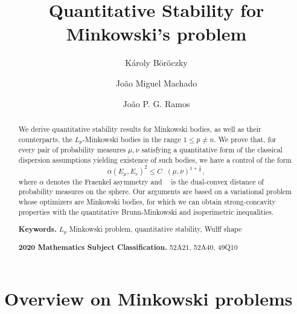 \documentclass[a4paper, 10pt, twoside]{amsart}
\title[Quantitative Stability for Minkowski's problem]{Quantitative Stability for Minkowski's problem}
\author{Károly Böröczky}
\author{João Miguel Machado}
\author{João P. G. Ramos}
\numberwithin{equation}{section}
\theoremstyle{plain}
\theoremstyle{definition}
\DeclareMathOperator{\dc}{\mathrm{d}_\mathrm{C}}
\begin{document}
\begin{abstract}
We derive quantitative stability results for Minkowski bodies, as well as their counterparts, the $L_p$-Minkowski bodies in the range $1 \le p \neq n$. We prove that, for every pair of probability measures $\mu,\nu$ satisfying a quantitative form of the classical dispersion assumptions yielding existence of such bodies, we have a control of the form 
\[
    \alpha(E_\mu, E_\nu)^2 \le C \dc(\mu,\nu)^{1 + \frac{1}{n}},
\]
where $\alpha$ denotes the Fraenkel asymmetry and $\dc$ is the dual-convex distance of probability measures on the sphere. Our arguments are based on a variational problem whose optimizers are Minkowski bodies, for which we can obtain strong-concavity properties with the quantitative Brunn-Minkowski and isoperimetric inequalities. 
\bigskip

\noindent\textbf{Keywords.} $L_p$ Minkowski problem, quantitative stability, Wulff shape

\medskip

\noindent\textbf{2020 Mathematics Subject Classification.} 52A21, 52A40, 49Q10

\end{abstract}

\maketitle
\tableofcontents

\section{Overview on Minkowski problems}\label{sec.introduction}
\end{document}
